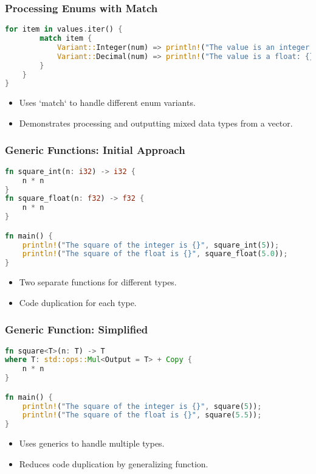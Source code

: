 \documentclass[aspectratio=169, table]{beamer}
\begin{document}
\begin{frame}[fragile]
\frametitle{Processing Enums with Match}
\begin{lstlisting}[language=Rust]
	for item in values.iter() { 
		match item {
			Variant::Integer(num) => println!("The value is an integer: {}", num), 
			Variant::Decimal(num) => println!("The value is a float: {}", num),  
		}
	}
}
\end{lstlisting}
\begin{itemize}
\item Uses `match` to handle different enum variants.
\item Demonstrates processing and outputting mixed data types from a vector.
\end{itemize}
\end{frame}


\begin{frame}[fragile]
\frametitle{Generic Functions: Initial Approach}
\vspace{20pt}
\begin{lstlisting}[language=Rust]
fn square_int(n: i32) -> i32 {
	n * n
}
fn square_float(n: f32) -> f32 {
	n * n
}

fn main() {
	println!("The square of the integer is {}", square_int(5));
	println!("The square of the float is {}", square_float(5.0));
}
\end{lstlisting}
\begin{itemize}
\item Two separate functions for different types.
\item Code duplication for each type.
\end{itemize}
\end{frame}

\begin{frame}[fragile]
\frametitle{Generic Function: Simplified}
\vspace{10pt}
\begin{lstlisting}[language=Rust]
fn square<T>(n: T) -> T
where T: std::ops::Mul<Output = T> + Copy {
	n * n
}

fn main() {
	println!("The square of the integer is {}", square(5));
	println!("The square of the float is {}", square(5.5));
}
\end{lstlisting}
\begin{itemize}
\item Uses generics to handle multiple types.
\item Reduces code duplication by generalizing function.
\end{itemize}
\end{frame}
\end{document}
